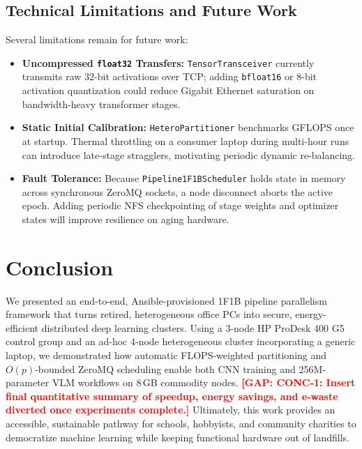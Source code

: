 \documentclass[conference]{IEEEtran}
\newcommand{\gap}[1]{\textcolor{red}{\textbf{[GAP: #1]}}}
\begin{document}
\subsection{Technical Limitations and Future Work}
Several limitations remain for future work:
\begin{itemize}
    \item \textbf{Uncompressed \texttt{float32} Transfers:} \texttt{TensorTransceiver} currently transmits raw 32-bit activations over TCP; adding \texttt{bfloat16} or 8-bit activation quantization could reduce Gigabit Ethernet saturation on bandwidth-heavy transformer stages.
    \item \textbf{Static Initial Calibration:} \texttt{HeteroPartitioner} benchmarks GFLOPS once at startup. Thermal throttling on a consumer laptop during multi-hour runs can introduce late-stage stragglers, motivating periodic dynamic re-balancing.
    \item \textbf{Fault Tolerance:} Because \texttt{Pipeline1F1BScheduler} holds state in memory across synchronous ZeroMQ sockets, a node disconnect aborts the active epoch. Adding periodic NFS checkpointing of stage weights and optimizer states will improve resilience on aging hardware.
\end{itemize}

\section{Conclusion}
We presented an end-to-end, Ansible-provisioned 1F1B pipeline parallelism framework that turns retired, heterogeneous office PCs into secure, energy-efficient distributed deep learning clusters. Using a 3-node HP ProDesk 400 G5 control group and an ad-hoc 4-node heterogeneous cluster incorporating a generic laptop, we demonstrated how automatic FLOPS-weighted partitioning and $O(p)$-bounded ZeroMQ scheduling enable both CNN training and 256M-parameter VLM workflows on 8\,GB commodity nodes. \gap{CONC-1: Insert final quantitative summary of speedup, energy savings, and e-waste diverted once experiments complete.} Ultimately, this work provides an accessible, sustainable pathway for schools, hobbyists, and community charities to democratize machine learning while keeping functional hardware out of landfills.



\end{document}
